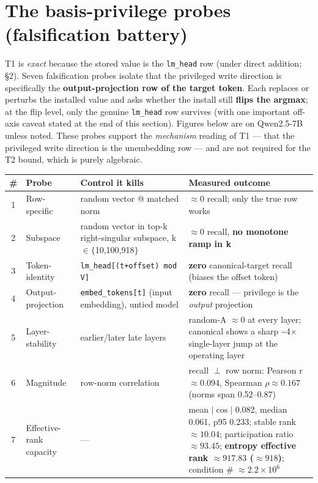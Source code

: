 \documentclass[11pt]{article}
\theoremstyle{plain}
\theoremstyle{definition}
\begin{document}
\section{The basis-privilege probes (falsification battery)}

T1 is \emph{exact} because the stored value is the \texttt{lm\_head} row (under direct addition; \S 2). Seven falsification probes isolate that the privileged write direction is specifically the \textbf{output-projection row of the target token}. Each replaces or perturbs the installed value and asks whether the install still \textbf{flips the argmax}; at the flip level, only the genuine \texttt{lm\_head} row survives (with one important off-axis caveat stated at the end of this section). Figures below are on Qwen2.5-7B unless noted. These probes support the \emph{mechanism} reading of T1 — that the privileged write direction is the unembedding row — and are not required for the T2 bound, which is purely algebraic.

\begin{table}[ht]\centering\footnotesize
\begin{tabular}{c p{2.6cm} p{3.6cm} p{4.6cm}}
\toprule
\# & Probe & Control it kills & Measured outcome \\
\midrule
1 & Row-specific & random vector @ matched norm & $\approx 0$ recall; only the true row works \\
2 & Subspace & random vector in top-k right-singular subspace, k$\in\{$10,100,918$\}$ & $\approx 0$ recall, \textbf{no monotone ramp in k} \\
3 & Token-identity & \texttt{lm\_head[(t+offset) mod V]} & \textbf{zero} canonical-target recall (biases the offset token) \\
4 & Output-projection & \texttt{embed\_tokens[t]} (input embedding), untied model & \textbf{zero} recall — privilege is the \emph{output} projection \\
5 & Layer-stability & earlier/later late layers & random-A $\approx 0$ at every layer; canonical shows a sharp \textasciitilde{}4$\times$ single-layer jump at the operating layer \\
6 & Magnitude & row-norm correlation & recall $\perp$ row norm: Pearson r $\approx 0.094$, Spearman $\rho \approx 0.167$ (norms span 0.52--0.87) \\
7 & Effective-rank capacity & --- & mean $|\cos|$ 0.082, median 0.061, p95 0.233; stable rank $\approx 10.04$; participation ratio $\approx 93.45$; \textbf{entropy effective rank $\approx 917.83$ ($\approx 918$)}; condition \# $\approx 2.2\times 10^{6}$ \\
\bottomrule
\end{tabular}
\end{table}
\end{document}
